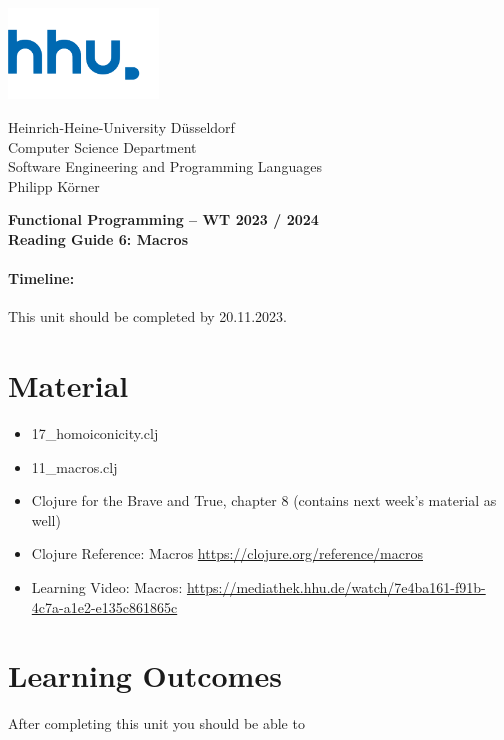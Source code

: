 \documentclass[11pt,a4paper]{article}
\begin{document}
\begin{minipage}[b]{\textwidth}
	\parbox[t]{5cm}{%
		\includegraphics[width=4cm]{unilogo}
		\hfill
	}
	\parbox[b]{11cm}{%
		Heinrich-Heine-University D\"usseldorf\\
		Computer Science Department\\
		Software Engineering and Programming Languages\\
		Philipp K\"orner
	}
\end{minipage}
\begin{center}
	\bf
	Functional Programming -- WT 2023 / 2024\\
	Reading Guide 6: Macros
\end{center}

\pagestyle{empty}

\paragraph{Timeline:} This unit should be completed by 20.11.2023.

\section{Material} 

\begin{itemize}
    \item 17\_homoiconicity.clj
    \item 11\_macros.clj
    \item Clojure for the Brave and True, chapter 8 (contains next week's material as well)
	\item Clojure Reference: Macros \url{https://clojure.org/reference/macros}
    \item Learning Video: Macros: \url{https://mediathek.hhu.de/watch/7e4ba161-f91b-4c7a-a1e2-e135c861865c}
\end{itemize}


\section{Learning Outcomes}

After completing this unit you should be able to
\end{document}
